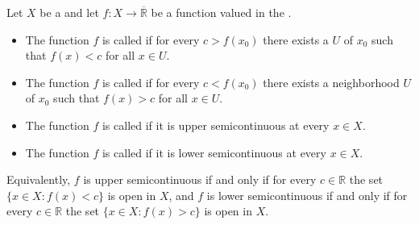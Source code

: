 \begin{definition} \label{definition:upper_and_lower_semicontinuous_function_on_a_topological_space}
    Let $X$ be a  and let $f : X \to \overline{\mathbb{R}}$ be a function valued in the .

    \begin{itemize}
        \item The function $f$ is called  if for every $c > f(x_0)$ there exists a  $U$ of $x_0$ such that $f(x) < c$ for all $x \in U$.

        \item The function $f$ is called  if for every $c < f(x_0)$ there exists a neighborhood $U$ of $x_0$ such that $f(x) > c$ for all $x \in U$.

        \item The function $f$ is called  if it is upper semicontinuous at every $x \in X$.

        \item The function $f$ is called  if it is lower semicontinuous at every $x \in X$.
    \end{itemize}

    Equivalently, $f$ is upper semicontinuous if and only if for every $c \in \mathbb{R}$ the set $\{x \in X : f(x) < c\}$ is open in $X$, and $f$ is lower semicontinuous if and only if for every $c \in \mathbb{R}$ the set $\{x \in X : f(x) > c\}$ is open in $X$.
\end{definition}